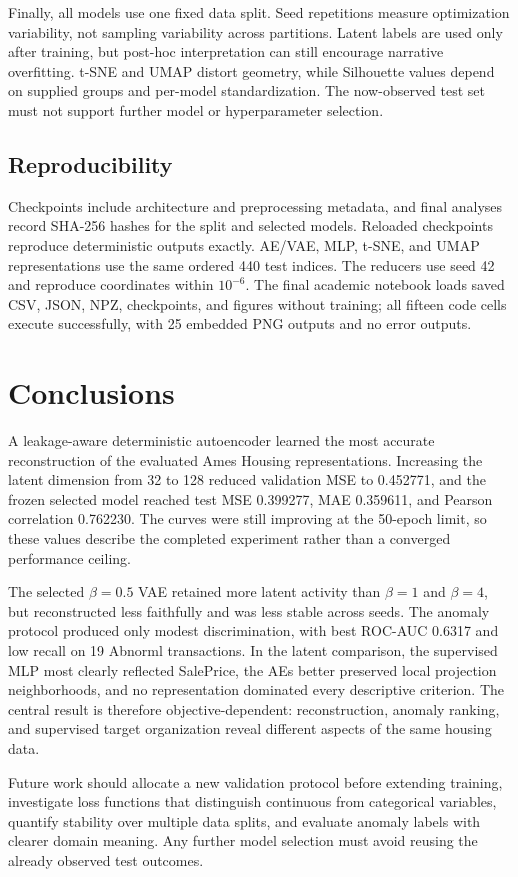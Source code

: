 \documentclass[11pt,letterpaper]{article}
\begin{document}
Finally, all models use one fixed data split. Seed repetitions measure optimization variability, not sampling variability across partitions. Latent labels are used only after training, but post-hoc interpretation can still encourage narrative overfitting. t-SNE and UMAP distort geometry, while Silhouette values depend on supplied groups and per-model standardization. The now-observed test set must not support further model or hyperparameter selection.

\subsection{Reproducibility}
Checkpoints include architecture and preprocessing metadata, and final analyses record SHA-256 hashes for the split and selected models. Reloaded checkpoints reproduce deterministic outputs exactly. AE/VAE, MLP, t-SNE, and UMAP representations use the same ordered 440 test indices. The reducers use seed 42 and reproduce coordinates within $10^{-6}$. The final academic notebook loads saved CSV, JSON, NPZ, checkpoints, and figures without training; all fifteen code cells execute successfully, with 25 embedded PNG outputs and no error outputs.

\section{Conclusions}
A leakage-aware deterministic autoencoder learned the most accurate reconstruction of the evaluated Ames Housing representations. Increasing the latent dimension from 32 to 128 reduced validation MSE to 0.452771, and the frozen selected model reached test MSE 0.399277, MAE 0.359611, and Pearson correlation 0.762230. The curves were still improving at the 50-epoch limit, so these values describe the completed experiment rather than a converged performance ceiling.

The selected $\beta=0.5$ VAE retained more latent activity than $\beta=1$ and $\beta=4$, but reconstructed less faithfully and was less stable across seeds. The anomaly protocol produced only modest discrimination, with best ROC-AUC 0.6317 and low recall on 19 Abnorml transactions. In the latent comparison, the supervised MLP most clearly reflected SalePrice, the AEs better preserved local projection neighborhoods, and no representation dominated every descriptive criterion. The central result is therefore objective-dependent: reconstruction, anomaly ranking, and supervised target organization reveal different aspects of the same housing data.

Future work should allocate a new validation protocol before extending training, investigate loss functions that distinguish continuous from categorical variables, quantify stability over multiple data splits, and evaluate anomaly labels with clearer domain meaning. Any further model selection must avoid reusing the already observed test outcomes.



\end{document}

